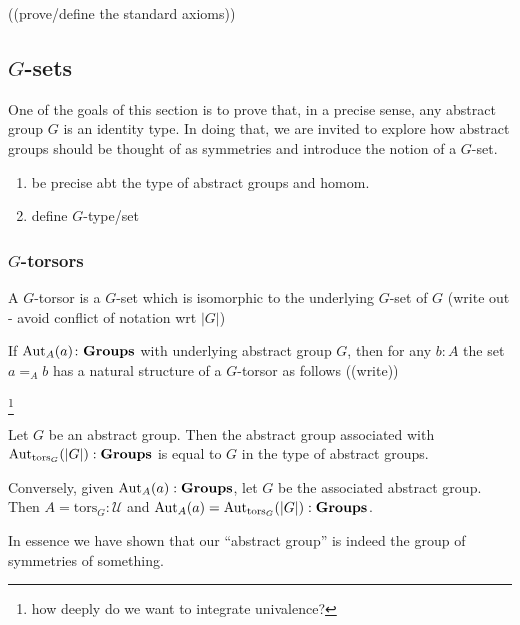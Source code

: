 \begin{definition}\label{def:grouphomomaxioms}
  ((prove/define the standard axioms))
\end{definition}




\subsection{$G$-sets}
\label{sec:gsets}
One of the goals of this section is to prove that, in a precise sense, any abstract group $G$ is an identity type.  In doing that, we are invited to explore how abstract groups should be thought of as symmetries and introduce the notion of a $G$-set.

\begin{enumerate}
\item be precise abt the type of abstract groups and homom.
\item define $G$-type/set
\end{enumerate}
\subsubsection{$G$-torsors}
\label{sec:Gtorsors}
\newcommand{\Gtorsor}{\mathrm{tors}_G}
\begin{definition}
  A $G$-torsor is a $G$-set which is isomorphic to the underlying $G$-set of $G$ (write out - avoid conflict of notation wrt $|G|$)
\end{definition}
\begin{example}
  If $\mathrm{Aut}_A(a)\colon\mathbf{Groups}$ with underlying abstract group $G$, then for any $b:A$ the set $a=_Ab$ has a natural structure of a $G$-torsor as follows ((write))
\end{example}

\footnote{how deeply do we want to integrate univalence?}
\begin{lemma}
  \label{lem:Groupsareidentitytypes}Let $G$ be an abstract group.  Then the abstract group associated with $\aut_{\Gtorsor}(|G|):\typegroup$ is equal to $G$ in the type of abstract groups.

Conversely, given $\mathrm{Aut}_A(a):\mathbf{Groups}$, let $G$ be the associated abstract group.  Then $A=\Gtorsor:\mathcal U$ and $\aut_A(a)=\aut_{\Gtorsor}(|G|):\typegroup$.
\end{lemma}
In essence we have shown that our ``abstract group'' is indeed the group of symmetries of something.


